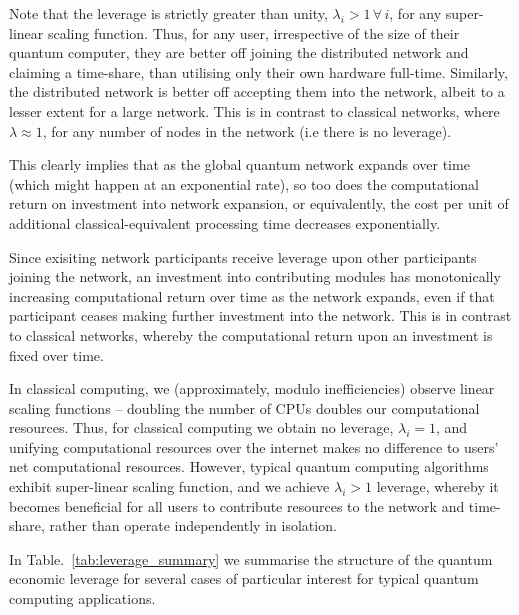 \documentclass[aps, rmp, twocolumn, amsmath, amssymb, nofootinbib, superscriptaddress, longbibliography, floatfix, table-of-contents, eqsecnum]{revtex4-1}
\renewcommand{\tablename}{ALG.}
\begin{document}
Note that the leverage is strictly greater than unity, \mbox{$\lambda_i>1\,\forall\, i$}, for any super-linear scaling function. Thus, for any user, irrespective of the size of their quantum computer, they are better off joining the distributed network and claiming a time-share, than utilising only their own hardware full-time. Similarly, the distributed network is better off accepting them into the network, albeit to a lesser extent for a large network. This is in contrast to classical networks, where \mbox{$\lambda\approx 1$}, for any number of nodes in the network (i.e there is no leverage).

This clearly implies that as the global quantum network expands over time (which might happen at an exponential rate), so too does the computational return on investment into network expansion, or equivalently, the cost per unit of additional classical-equivalent processing time decreases exponentially.

Since exisiting network participants receive leverage upon other participants joining the network, an investment into contributing modules has monotonically increasing computational return over time as the network expands, even if that participant ceases making further investment into the network. This is in contrast to classical networks, whereby the computational return upon an investment is fixed over time.

In classical computing, we (approximately, modulo inefficiencies) observe linear scaling functions -- doubling the number of CPUs doubles our computational resources. Thus, for classical computing we obtain no leverage, \mbox{$\lambda_i=1$}, and unifying computational resources over the internet makes no difference to users' net computational resources. However, typical quantum computing algorithms exhibit super-linear scaling function, and we achieve \mbox{$\lambda_i>1$} leverage, whereby it becomes beneficial for all users to contribute resources to the network and time-share, rather than operate independently in isolation.

In Table.~\ref{tab:leverage_summary} we summarise the structure of the quantum economic leverage for several cases of particular interest for typical quantum computing applications.

\renewcommand{\tablename}{TABLE}
\end{document}
